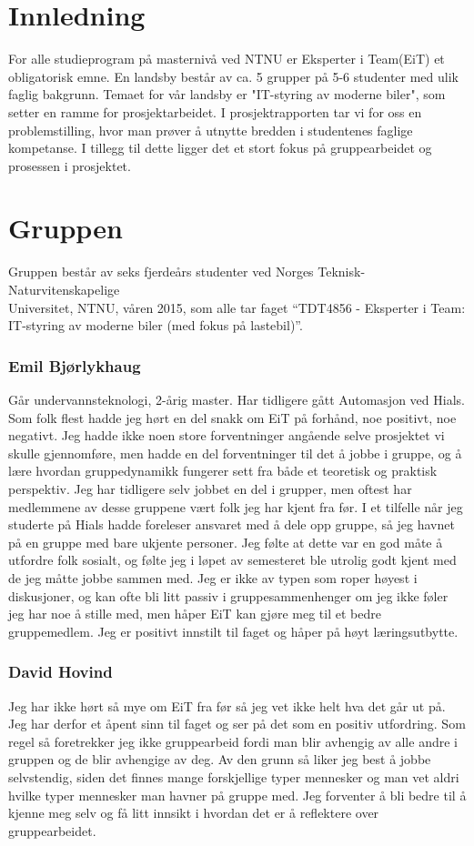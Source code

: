 \chapter{Innledning}
For alle studieprogram på masternivå ved NTNU er Eksperter i Team(EiT) et obligatorisk emne. En landsby består 
av ca. 5 grupper på 5-6 studenter med ulik faglig bakgrunn. Temaet for vår landsby er "IT-styring av moderne 
biler", som setter en ramme for prosjektarbeidet. I prosjektrapporten tar vi for oss en problemstilling, hvor man prøver 
å utnytte bredden i studentenes faglige kompetanse. I tillegg til dette ligger det et stort fokus på gruppearbeidet og 
prosessen i prosjektet. 

\chapter{Gruppen} 
Gruppen består av seks fjerdeårs studenter ved Norges Teknisk-
Naturvitenskapelige\\Universitet, NTNU, våren 2015, som alle tar faget ``TDT4856 
- Eksperter i Team: IT-styring av moderne biler (med fokus på lastebil)''.

\subsection*{Emil Bjørlykhaug}
Går undervannsteknologi, 2-årig master. Har tidligere gått Automasjon ved Hials.
Som folk flest hadde jeg hørt en del snakk om EiT på forhånd, noe positivt, noe negativt. 
Jeg hadde ikke noen store forventninger angående selve prosjektet vi skulle gjennomføre,
 men hadde en del forventninger til det å jobbe i gruppe, og å lære hvordan gruppedynamikk 
fungerer sett fra både et teoretisk og praktisk perspektiv. Jeg har tidligere selv jobbet 
en del i grupper, men oftest har medlemmene av desse gruppene vært folk jeg har kjent 
fra før. I et tilfelle når jeg studerte på Hials hadde foreleser ansvaret med å dele opp gruppe, 
så jeg havnet på en gruppe med bare ukjente personer. Jeg følte at dette var en god måte å 
utfordre folk sosialt, og følte jeg i løpet av semesteret ble utrolig godt kjent med de jeg 
måtte jobbe sammen med.
Jeg er ikke av typen som roper høyest i diskusjoner, og kan ofte bli litt passiv i 
gruppesammenhenger om jeg ikke føler jeg har noe å stille med, men håper 
EiT kan gjøre meg til et bedre gruppemedlem. Jeg er positivt innstilt til faget 
og håper på høyt læringsutbytte.

\subsection*{David Hovind} Jeg har ikke hørt så mye om EiT fra før så jeg vet ikke helt hva det går ut på. 
Jeg har derfor et åpent sinn til faget og ser på det som en positiv utfordring. 
Som regel så foretrekker jeg ikke gruppearbeid fordi man blir avhengig av alle andre i gruppen og de blir avhengige av deg. 
Av den grunn så liker jeg best å jobbe selvstendig, siden det finnes mange forskjellige typer mennesker og man vet aldri 
hvilke typer mennesker man havner på gruppe med. Jeg forventer å bli bedre til å kjenne meg selv og få litt innsikt i 
hvordan det er å reflektere over gruppearbeidet.

